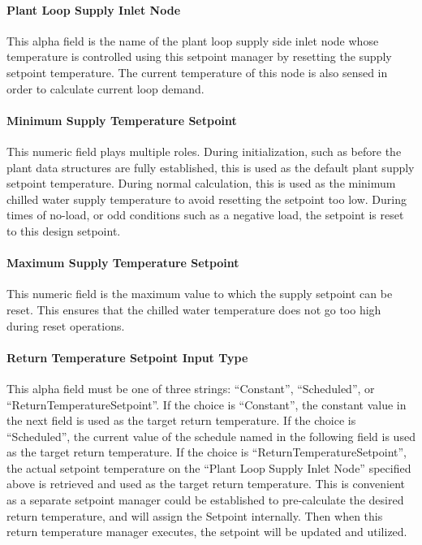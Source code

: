 \paragraph{Plant Loop Supply Inlet Node}\label{plant-loop-supply-inlet-node}

This alpha field is the name of the plant loop supply side inlet node whose temperature is controlled using this setpoint manager by resetting the supply setpoint temperature. The current temperature of this node is also sensed in order to calculate current loop demand.

\paragraph{Minimum Supply Temperature Setpoint}\label{minimum-supply-temperature-setpoint}

This numeric field plays multiple roles. During initialization, such as before the plant data structures are fully established, this is used as the default plant supply setpoint temperature. During normal calculation, this is used as the minimum chilled water supply temperature to avoid resetting the setpoint too low. During times of no-load, or odd conditions such as a negative load, the setpoint is reset to this design setpoint.

\paragraph{Maximum Supply Temperature Setpoint}\label{maximum-supply-temperature-setpoint}

This numeric field is the maximum value to which the supply setpoint can be reset. This ensures that the chilled water temperature does not go too high during reset operations.

\paragraph{Return Temperature Setpoint Input Type}\label{return-temperature-setpoint-input-type}

This alpha field must be one of three strings: ``Constant'', ``Scheduled'', or ``ReturnTemperatureSetpoint''. If the choice is ``Constant'', the constant value in the next field is used as the target return temperature. If the choice is ``Scheduled'', the current value of the schedule named in the following field is used as the target return temperature. If the choice is ``ReturnTemperatureSetpoint'', the actual setpoint temperature on the ``Plant Loop Supply Inlet Node'' specified above is retrieved and used as the target return temperature. This is convenient as a separate setpoint manager could be established to pre-calculate the desired return temperature, and will assign the Setpoint internally. Then when this return temperature manager executes, the setpoint will be updated and utilized.

